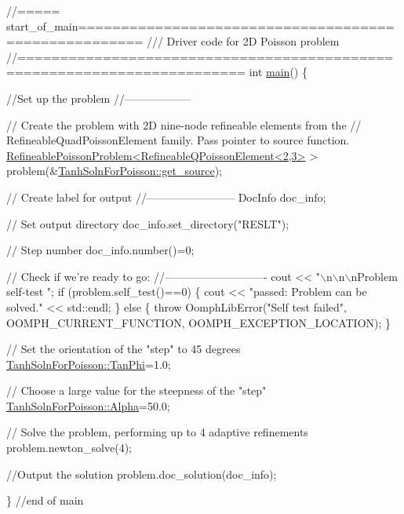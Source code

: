  
\begin{DoxyCodeInclude}
\textcolor{comment}{//===== start\_of\_main=====================================================}
\textcolor{comment}{/// Driver code for 2D Poisson problem}
\textcolor{comment}{}\textcolor{comment}{//========================================================================}
\textcolor{keywordtype}{int} \hyperlink{two__d__poisson__adapt_8cc_ae66f6b31b5ad750f1fe042a706a4e3d4}{main}()
\{

 \textcolor{comment}{//Set up the problem}
 \textcolor{comment}{//------------------}

 \textcolor{comment}{// Create the problem with 2D nine-node refineable elements from the}
 \textcolor{comment}{// RefineableQuadPoissonElement family. Pass pointer to source function. }
 \hyperlink{classRefineablePoissonProblem}{RefineablePoissonProblem<RefineableQPoissonElement<2,3>}
       > 
  problem(&\hyperlink{namespaceTanhSolnForPoisson_ae1b9d6789ff301e3d63a4e292213036c}{TanhSolnForPoisson::get\_source});
 
 \textcolor{comment}{// Create label for output}
 \textcolor{comment}{//------------------------}
 DocInfo doc\_info;

 \textcolor{comment}{// Set output directory}
 doc\_info.set\_directory(\textcolor{stringliteral}{"RESLT"});

 \textcolor{comment}{// Step number}
 doc\_info.number()=0;

 \textcolor{comment}{// Check if we're ready to go:}
 \textcolor{comment}{//----------------------------}
 cout << \textcolor{stringliteral}{"\(\backslash\)n\(\backslash\)n\(\backslash\)nProblem self-test "};
 \textcolor{keywordflow}{if} (problem.self\_test()==0) 
  \{
   cout << \textcolor{stringliteral}{"passed: Problem can be solved."} << std::endl;
  \}
 \textcolor{keywordflow}{else} 
  \{
   \textcolor{keywordflow}{throw} OomphLibError(\textcolor{stringliteral}{"Self test failed"},
                       OOMPH\_CURRENT\_FUNCTION,
                       OOMPH\_EXCEPTION\_LOCATION);
  \}

 
 \textcolor{comment}{// Set the orientation of the "step" to 45 degrees}
 \hyperlink{namespaceTanhSolnForPoisson_a785ccd00a727125a5138fbbcac173294}{TanhSolnForPoisson::TanPhi}=1.0;
 
 \textcolor{comment}{// Choose a large value for the steepness of the "step"}
 \hyperlink{namespaceTanhSolnForPoisson_ae676ccd186d5df119cce811596d949c1}{TanhSolnForPoisson::Alpha}=50.0; 

 \textcolor{comment}{// Solve the problem, performing up to 4 adaptive refinements}
 problem.newton\_solve(4);
 
 \textcolor{comment}{//Output the solution}
 problem.doc\_solution(doc\_info);
 
\} \textcolor{comment}{//end of main}

\end{DoxyCodeInclude}




